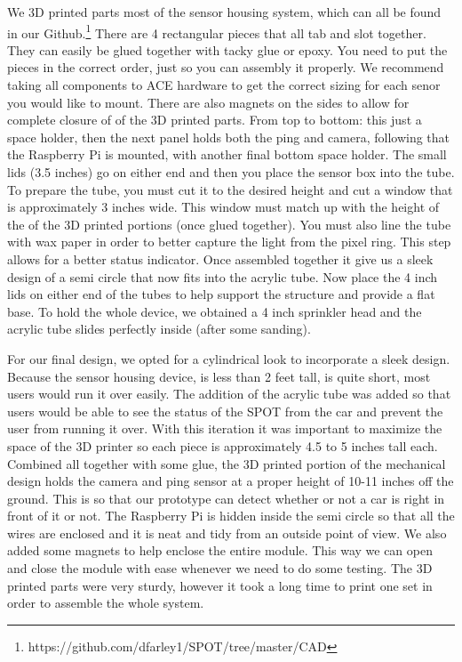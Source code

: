     We 3D printed parts most of the sensor housing system, which can all be found in our Github.\footnote{https://github.com/dfarley1/SPOT/tree/master/CAD}
There are 4 rectangular pieces that all tab and slot together. 
They can easily be glued together with tacky glue or epoxy. 
You need to put the pieces in the correct order, just so you can assembly it properly. 
We recommend taking all components to ACE hardware to get the correct sizing for each senor you would like to mount.
There are also magnets on the sides to allow for complete closure of of the 3D printed parts.
From top to bottom: this just a space holder, then the next panel holds both the ping and camera, following that the Raspberry  Pi is mounted, with another final bottom space holder.
The small lids (3.5 inches) go on either end and then you place the sensor box into the tube. 
To prepare the tube, you must cut it to the desired height and cut a window that is approximately 3 inches wide. 
This window must match up with the height of the of the 3D printed portions (once glued together).
You must also line the tube with wax paper in order to better capture the light from the pixel ring. 
This step allows for a better status indicator. 
Once assembled together it give us a sleek design of a semi circle that now fits into the acrylic tube.
Now place the 4 inch lids on either end of the tubes to help support the structure and provide a flat base. 
To hold the whole device, we obtained a 4 inch sprinkler head and the acrylic tube slides perfectly inside (after some sanding).

    For our final design, we opted for a cylindrical look to incorporate a sleek design.
Because the sensor housing device, is less than 2 feet tall, is quite short, most users would run it over easily. 
The addition of the acrylic tube was added so that users would be able to see the status of the SPOT from the car and prevent the user from running it over. 
With this iteration it was important to maximize the space of the 3D printer so each piece is approximately 4.5 to 5 inches tall each. 
Combined all together with some glue, the 3D printed portion of the mechanical design holds the camera and ping sensor at a proper height of 10-11 inches off the ground.
This is so that our prototype can detect whether or not a car is right in front of it or not. 
The Raspberry Pi is hidden inside the semi circle so that all the wires are enclosed and it is neat and tidy from an outside point of view. 
We also added some magnets to help enclose the entire module. 
This way we can open and close the module with ease whenever we need to do some testing. 
The 3D printed parts were very sturdy, however it took a long time to print one set in order to assemble the whole system.

